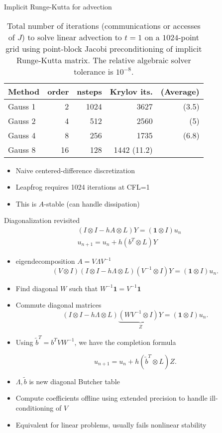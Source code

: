 \documentclass{beamer}
\begin{document}
\begin{frame}{Implicit Runge-Kutta for advection}
  \begin{table}
    \centering
    \caption{Total number of iterations (communications or accesses of $J$) to solve linear advection to $t=1$ on a $1024$-point grid using point-block Jacobi preconditioning of implicit Runge-Kutta matrix.
      The relative algebraic solver tolerance is $10^{-8}$.}\label{tab:irk-advection}
    \begin{tabular}{lrrrr}
      \toprule
      Method & order & nsteps & Krylov its. & (Average) \\
      \midrule
      Gauss 1 & 2 & 1024 & 3627 & (3.5) \\
      Gauss 2 & 4 & 512 & 2560 & (5) \\
      Gauss 4 & 8 & 256 & 1735 & (6.8) \\
      Gauss 8 & 16 & 128 & 1442 (11.2) \\
      \bottomrule
    \end{tabular}
  \end{table}
  \begin{itemize}
  \item Naive centered-difference discretization
  \item Leapfrog requires 1024 iterations at CFL=1
  \item This is $A$-stable (can handle dissipation)
  \end{itemize}
\end{frame}

\begin{frame}{Diagonalization revisited}
  \begin{gather} (I \otimes I - hA \otimes L) Y = (\mathbf{1} \otimes I) u_n \\
    u_{n+1} = u_n + h (b^T \otimes L) Y \end{gather}
  \begin{itemize}
  \item eigendecomposition $A = V \Lambda V^{-1}$
    $$ (V \otimes I) (I \otimes I - h \Lambda \otimes L) (V^{-1} \otimes I)Y = (\mathbf 1 \otimes I) u_n . $$
  \item Find diagonal $W$ such that $W^{-1} \mathbf 1 = V^{-1} \mathbf 1$
  \item Commute diagonal matrices
    $$ (I \otimes I - h \Lambda \otimes L) \underbrace{(WV^{-1} \otimes I)Y}_Z = (\mathbf 1 \otimes I) u_n . $$
  \item Using $\tilde b^T = b^T V W^{-1}$, we have the completion formula

    $$ u_{n+1} = u_n + h (\tilde b^T \otimes L) Z . $$
  \item $\Lambda, \tilde b$ is new diagonal Butcher table
  \item Compute coefficients offline using extended precision to handle ill-conditioning of $V$
  \item Equivalent for linear problems, usually fails nonlinear stability
  \end{itemize}
\end{frame}
\end{document}
